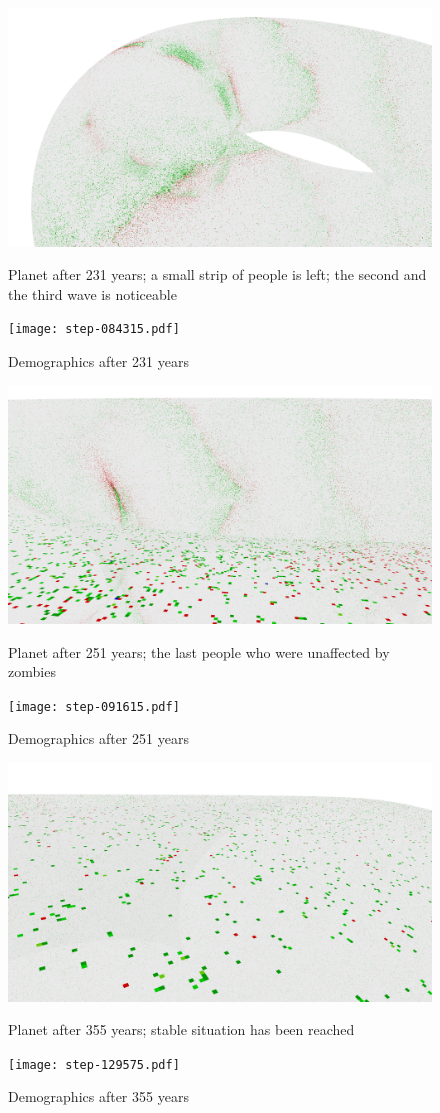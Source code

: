 \documentclass[a4paper]{article}
\begin{document}
\begin{figure}[pht]
    \centering
    \includegraphics[width=\textwidth]{torus/step-084315-torus.png}
    \caption{Planet after 231 years; a small strip of people is left; the second and the third wave is noticeable}
    \texttt{[image: step-084315.pdf]}
    \caption{Demographics after 231 years}
\end{figure}

\begin{figure}[pht]
    \centering
    \includegraphics[width=\textwidth]{torus/step-091615-torus.png}
    \caption{Planet after 251 years; the last people who were unaffected by zombies}
    \texttt{[image: step-091615.pdf]}
    \caption{Demographics after 251 years}
\end{figure}

\begin{figure}[pht]
    \centering
    \includegraphics[width=\textwidth]{torus/step-129575-torus.png}
    \caption{Planet after 355 years; stable situation has been reached}
    \texttt{[image: step-129575.pdf]}
    \caption{Demographics after 355 years}
\end{figure}
\end{document}
